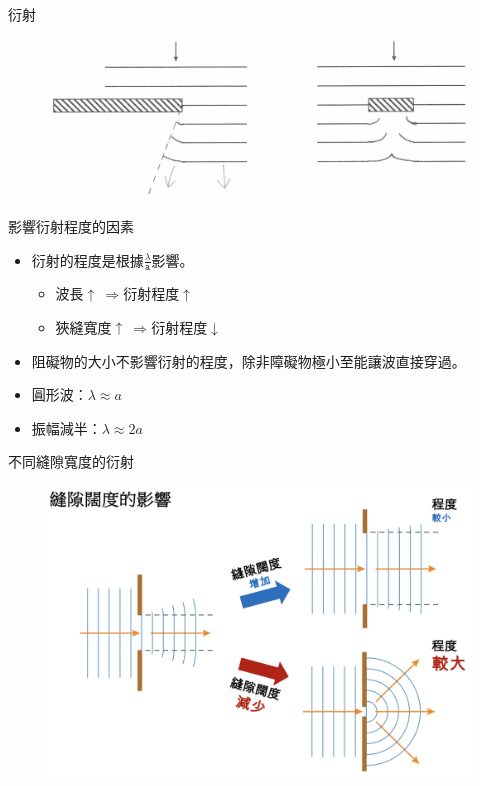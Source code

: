 \documentclass[13pt]{beamer}
\begin{document}
\begin{frame}{衍射}
    \begin{figure}
        \centering
        \includegraphics[width=1\linewidth]{images/Screenshot 2023-09-27 at 9.09.03 PM.png}


    \end{figure}
\end{frame}

\begin{frame}{影響衍射程度的因素}
    \begin{itemize}
        \item 衍射的程度是根據$\displaystyle \frac{\lambda}{\texttt{a}}$影響。
              \begin{itemize}
                  \item 波長$\uparrow\ \Rightarrow$衍射程度$\uparrow$
                  \item 狹縫寬度$\uparrow\ \Rightarrow$衍射程度$\downarrow$
              \end{itemize}
        \item 阻礙物的大小不影響衍射的程度，除非障礙物極小至能讓波直接穿過。
        \item 圓形波：\(\lambda \approx a\)
        \item 振幅減半：$\lambda \approx 2a$
    \end{itemize}
\end{frame}

\begin{frame}{不同縫隙寬度的衍射}
    \begin{figure}
        \centering
        \includegraphics[width=0.95\linewidth]{images/Screenshot 2023-09-27 at 9.51.08 PM.png}


    \end{figure}
\end{frame}
\end{document}

